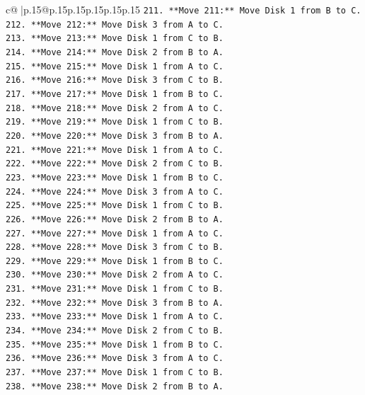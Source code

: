 \documentclass{article}
\begin{document}
{\begin{supertabular}{c@{$\;$}|p{.15\linewidth}@{}p{.15\linewidth}p{.15\linewidth}p{.15\linewidth}p{.15\linewidth}p{.15\linewidth}}
{{{\texttt{211. **Move 211:** Move Disk 1 from B to C.} \\
\texttt{212. **Move 212:** Move Disk 3 from A to C.} \\
\texttt{213. **Move 213:** Move Disk 1 from C to B.} \\
\texttt{214. **Move 214:** Move Disk 2 from B to A.} \\
\texttt{215. **Move 215:** Move Disk 1 from A to C.} \\
\texttt{216. **Move 216:** Move Disk 3 from C to B.} \\
\texttt{217. **Move 217:** Move Disk 1 from B to C.} \\
\texttt{218. **Move 218:** Move Disk 2 from A to C.} \\
\texttt{219. **Move 219:** Move Disk 1 from C to B.} \\
\texttt{220. **Move 220:** Move Disk 3 from B to A.} \\
\texttt{221. **Move 221:** Move Disk 1 from A to C.} \\
\texttt{222. **Move 222:** Move Disk 2 from C to B.} \\
\texttt{223. **Move 223:** Move Disk 1 from B to C.} \\
\texttt{224. **Move 224:** Move Disk 3 from A to C.} \\
\texttt{225. **Move 225:** Move Disk 1 from C to B.} \\
\texttt{226. **Move 226:** Move Disk 2 from B to A.} \\
\texttt{227. **Move 227:** Move Disk 1 from A to C.} \\
\texttt{228. **Move 228:** Move Disk 3 from C to B.} \\
\texttt{229. **Move 229:** Move Disk 1 from B to C.} \\
\texttt{230. **Move 230:** Move Disk 2 from A to C.} \\
\texttt{231. **Move 231:** Move Disk 1 from C to B.} \\
\texttt{232. **Move 232:** Move Disk 3 from B to A.} \\
\texttt{233. **Move 233:** Move Disk 1 from A to C.} \\
\texttt{234. **Move 234:** Move Disk 2 from C to B.} \\
\texttt{235. **Move 235:** Move Disk 1 from B to C.} \\
\texttt{236. **Move 236:** Move Disk 3 from A to C.} \\
\texttt{237. **Move 237:** Move Disk 1 from C to B.} \\
\texttt{238. **Move 238:** Move Disk 2 from B to A.} \\
}}}
\end{supertabular}}
\end{document}
